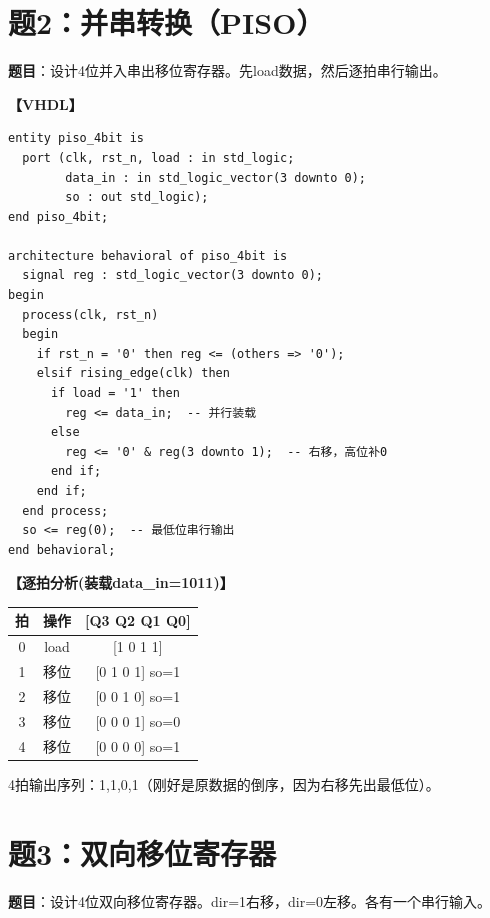 \section{题2：并串转换（PISO）}

\textbf{题目}：设计4位并入串出移位寄存器。先load数据，然后逐拍串行输出。

\begin{solution}[完整解答]

\textbf{【VHDL】}
\begin{lstlisting}
entity piso_4bit is
  port (clk, rst_n, load : in std_logic;
        data_in : in std_logic_vector(3 downto 0);
        so : out std_logic);
end piso_4bit;

architecture behavioral of piso_4bit is
  signal reg : std_logic_vector(3 downto 0);
begin
  process(clk, rst_n)
  begin
    if rst_n = '0' then reg <= (others => '0');
    elsif rising_edge(clk) then
      if load = '1' then
        reg <= data_in;  -- 并行装载
      else
        reg <= '0' & reg(3 downto 1);  -- 右移，高位补0
      end if;
    end if;
  end process;
  so <= reg(0);  -- 最低位串行输出
end behavioral;
\end{lstlisting}

\textbf{【逐拍分析(装载data\_in=1011)】}
\begin{center}
\begin{tabular}{|c|c|c|}\hline
拍 & 操作 & [Q3 Q2 Q1 Q0] \\ \hline
0 & load & [1 0 1 1] \\ \hline
1 & 移位 & [0 1 0 1] so=1 \\ \hline
2 & 移位 & [0 0 1 0] so=1 \\ \hline
3 & 移位 & [0 0 0 1] so=0 \\ \hline
4 & 移位 & [0 0 0 0] so=1 \\ \hline
\end{tabular}
\end{center}
4拍输出序列：1,1,0,1（刚好是原数据的倒序，因为右移先出最低位）。

\end{solution}


\section{题3：双向移位寄存器}

\textbf{题目}：设计4位双向移位寄存器。dir=1右移，dir=0左移。各有一个串行输入。


